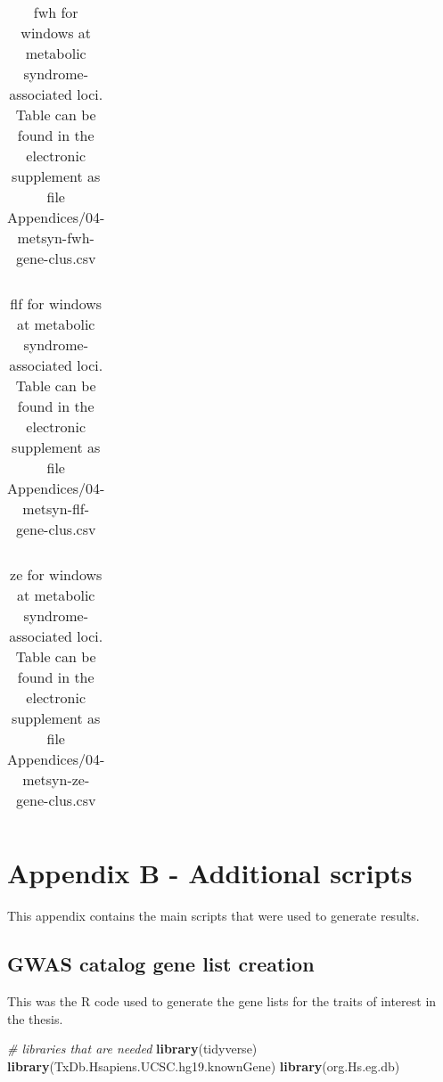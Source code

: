 \documentclass[]{report}
\newenvironment{Shaded}{\begin{snugshade}}{\end{snugshade}}
\newcommand{\KeywordTok}[1]{\textcolor[rgb]{0.13,0.29,0.53}{\textbf{#1}}}
\newcommand{\CommentTok}[1]{\textcolor[rgb]{0.56,0.35,0.01}{\textit{#1}}}
\newcommand{\NormalTok}[1]{#1}
\begin{document}
\begin{appendices}
\begin{table}[!htb]
\caption[\gls{fwh} for windows at metabolic syndrome-associated loci.]{\gls{fwh} for windows at metabolic syndrome-associated loci. Table can be found in the electronic supplement as file Appendices/04-metsyn-fwh-gene-clus.csv}
\centering
  \begin{tabular}{l l}
  \end{tabular}
  \label{tab:metsynfwhgeneclus}
\end{table}

\begin{table}[!htb]
\caption[\gls{flf} for windows at metabolic syndrome-associated loci.]{\gls{flf} for windows at metabolic syndrome-associated loci. Table can be found in the electronic supplement as file Appendices/04-metsyn-flf-gene-clus.csv}
\centering
  \begin{tabular}{l l}
  \end{tabular}
  \label{tab:metsynflfgeneclus}
\end{table}

\begin{table}[!htb]
\caption[\gls{ze} for windows at metabolic syndrome-associated loci.]{\gls{ze} for windows at metabolic syndrome-associated loci. Table can be found in the electronic supplement as file Appendices/04-metsyn-ze-gene-clus.csv}
\centering
  \begin{tabular}{l l}
  \end{tabular}
  \label{tab:metsynzegeneclus}
\end{table}

\chapter{Appendix B - Additional
scripts}\label{appendix-b---additional-scripts}

This appendix contains the main scripts that were used to generate
results.

\section{GWAS catalog gene list creation}\label{gwascatlist}

This was the R code used to generate the gene lists for the traits of
interest in the thesis.

\begin{Shaded}
\begin{Highlighting}[]
\CommentTok{# libraries that are needed}
\KeywordTok{library}\NormalTok{(tidyverse)}
\KeywordTok{library}\NormalTok{(TxDb.Hsapiens.UCSC.hg19.knownGene)}
\KeywordTok{library}\NormalTok{(org.Hs.eg.db)}


\end{Highlighting}
\end{Shaded}
\end{appendices}
\end{document}
